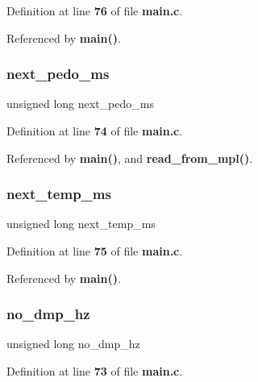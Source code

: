 Definition at line \textbf{ 76} of file \textbf{ main.\+c}.



Referenced by \textbf{ main()}.

\mbox{\label{group__eMPL_gaa40f644b7de352cb9ad81e2c602b5bae}} 
\subsubsection{next\+\_\+pedo\+\_\+ms}
{\footnotesize\ttfamily unsigned long next\+\_\+pedo\+\_\+ms}



Definition at line \textbf{ 74} of file \textbf{ main.\+c}.



Referenced by \textbf{ main()}, and \textbf{ read\+\_\+from\+\_\+mpl()}.

\mbox{\label{group__eMPL_ga6f7f2c3d9913da113b6c5df295f50422}} 
\subsubsection{next\+\_\+temp\+\_\+ms}
{\footnotesize\ttfamily unsigned long next\+\_\+temp\+\_\+ms}



Definition at line \textbf{ 75} of file \textbf{ main.\+c}.



Referenced by \textbf{ main()}.

\mbox{\label{group__eMPL_ga1418e767c7efaa0fb2b3a55b7a69b44b}} 
\subsubsection{no\+\_\+dmp\+\_\+hz}
{\footnotesize\ttfamily unsigned long no\+\_\+dmp\+\_\+hz}



Definition at line \textbf{ 73} of file \textbf{ main.\+c}.

\mbox{\label{group__eMPL_gaf119b3b2187456063d2687f989236daf}} 
